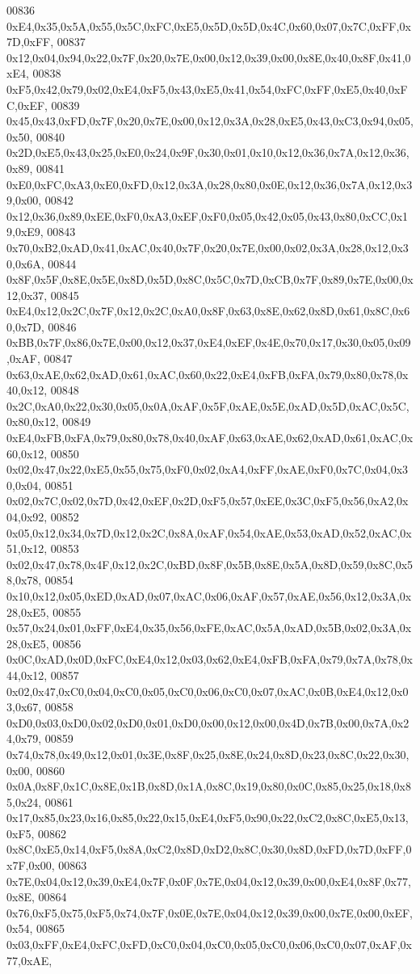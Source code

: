 \begin{DoxyCode}
00836 0xE4,0x35,0x5A,0x55,0x5C,0xFC,0xE5,0x5D,0x5D,0x4C,0x60,0x07,0x7C,0xFF,0x7D,0xFF,
00837 0x12,0x04,0x94,0x22,0x7F,0x20,0x7E,0x00,0x12,0x39,0x00,0x8E,0x40,0x8F,0x41,0xE4,
00838 0xF5,0x42,0x79,0x02,0xE4,0xF5,0x43,0xE5,0x41,0x54,0xFC,0xFF,0xE5,0x40,0xFC,0xEF,
00839 0x45,0x43,0xFD,0x7F,0x20,0x7E,0x00,0x12,0x3A,0x28,0xE5,0x43,0xC3,0x94,0x05,0x50,
00840 0x2D,0xE5,0x43,0x25,0xE0,0x24,0x9F,0x30,0x01,0x10,0x12,0x36,0x7A,0x12,0x36,0x89,
00841 0xE0,0xFC,0xA3,0xE0,0xFD,0x12,0x3A,0x28,0x80,0x0E,0x12,0x36,0x7A,0x12,0x39,0x00,
00842 0x12,0x36,0x89,0xEE,0xF0,0xA3,0xEF,0xF0,0x05,0x42,0x05,0x43,0x80,0xCC,0x19,0xE9,
00843 0x70,0xB2,0xAD,0x41,0xAC,0x40,0x7F,0x20,0x7E,0x00,0x02,0x3A,0x28,0x12,0x30,0x6A,
00844 0x8F,0x5F,0x8E,0x5E,0x8D,0x5D,0x8C,0x5C,0x7D,0xCB,0x7F,0x89,0x7E,0x00,0x12,0x37,
00845 0xE4,0x12,0x2C,0x7F,0x12,0x2C,0xA0,0x8F,0x63,0x8E,0x62,0x8D,0x61,0x8C,0x60,0x7D,
00846 0xBB,0x7F,0x86,0x7E,0x00,0x12,0x37,0xE4,0xEF,0x4E,0x70,0x17,0x30,0x05,0x09,0xAF,
00847 0x63,0xAE,0x62,0xAD,0x61,0xAC,0x60,0x22,0xE4,0xFB,0xFA,0x79,0x80,0x78,0x40,0x12,
00848 0x2C,0xA0,0x22,0x30,0x05,0x0A,0xAF,0x5F,0xAE,0x5E,0xAD,0x5D,0xAC,0x5C,0x80,0x12,
00849 0xE4,0xFB,0xFA,0x79,0x80,0x78,0x40,0xAF,0x63,0xAE,0x62,0xAD,0x61,0xAC,0x60,0x12,
00850 0x02,0x47,0x22,0xE5,0x55,0x75,0xF0,0x02,0xA4,0xFF,0xAE,0xF0,0x7C,0x04,0x30,0x04,
00851 0x02,0x7C,0x02,0x7D,0x42,0xEF,0x2D,0xF5,0x57,0xEE,0x3C,0xF5,0x56,0xA2,0x04,0x92,
00852 0x05,0x12,0x34,0x7D,0x12,0x2C,0x8A,0xAF,0x54,0xAE,0x53,0xAD,0x52,0xAC,0x51,0x12,
00853 0x02,0x47,0x78,0x4F,0x12,0x2C,0xBD,0x8F,0x5B,0x8E,0x5A,0x8D,0x59,0x8C,0x58,0x78,
00854 0x10,0x12,0x05,0xED,0xAD,0x07,0xAC,0x06,0xAF,0x57,0xAE,0x56,0x12,0x3A,0x28,0xE5,
00855 0x57,0x24,0x01,0xFF,0xE4,0x35,0x56,0xFE,0xAC,0x5A,0xAD,0x5B,0x02,0x3A,0x28,0xE5,
00856 0x0C,0xAD,0x0D,0xFC,0xE4,0x12,0x03,0x62,0xE4,0xFB,0xFA,0x79,0x7A,0x78,0x44,0x12,
00857 0x02,0x47,0xC0,0x04,0xC0,0x05,0xC0,0x06,0xC0,0x07,0xAC,0x0B,0xE4,0x12,0x03,0x67,
00858 0xD0,0x03,0xD0,0x02,0xD0,0x01,0xD0,0x00,0x12,0x00,0x4D,0x7B,0x00,0x7A,0x24,0x79,
00859 0x74,0x78,0x49,0x12,0x01,0x3E,0x8F,0x25,0x8E,0x24,0x8D,0x23,0x8C,0x22,0x30,0x00,
00860 0x0A,0x8F,0x1C,0x8E,0x1B,0x8D,0x1A,0x8C,0x19,0x80,0x0C,0x85,0x25,0x18,0x85,0x24,
00861 0x17,0x85,0x23,0x16,0x85,0x22,0x15,0xE4,0xF5,0x90,0x22,0xC2,0x8C,0xE5,0x13,0xF5,
00862 0x8C,0xE5,0x14,0xF5,0x8A,0xC2,0x8D,0xD2,0x8C,0x30,0x8D,0xFD,0x7D,0xFF,0x7F,0x00,
00863 0x7E,0x04,0x12,0x39,0xE4,0x7F,0x0F,0x7E,0x04,0x12,0x39,0x00,0xE4,0x8F,0x77,0x8E,
00864 0x76,0xF5,0x75,0xF5,0x74,0x7F,0x0E,0x7E,0x04,0x12,0x39,0x00,0x7E,0x00,0xEF,0x54,
00865 0x03,0xFF,0xE4,0xFC,0xFD,0xC0,0x04,0xC0,0x05,0xC0,0x06,0xC0,0x07,0xAF,0x77,0xAE,

\end{DoxyCode}
